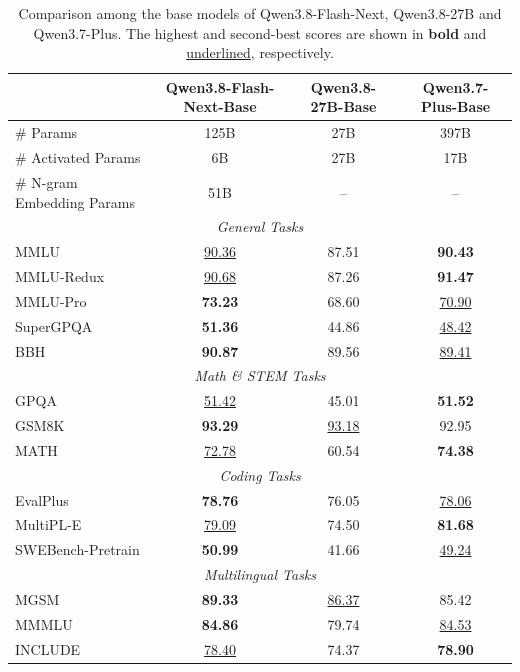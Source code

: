 \begin{table}[h]
\centering
\caption{Comparison among the base models of Qwen3.8-Flash-Next, Qwen3.8-27B and Qwen3.7-Plus. The highest and second-best scores are shown in \textbf{bold} and \underline{underlined}, respectively.}
\label{tab:qwen37-comparison}
\small
\begin{tabular}{@{}lccc@{}}
\toprule
 & \textbf{Qwen3.8-Flash-Next-Base} & \textbf{Qwen3.8-27B-Base} & \textbf{Qwen3.7-Plus-Base} \\
\midrule
\# Params & 125B & 27B & 397B \\
\# Activated Params & 6B & 27B & 17B \\
\# N-gram Embedding Params & 51B & -- & -- \\
\midrule
\multicolumn{4}{c}{\textit{General Tasks}} \\
\midrule
MMLU & \underline{90.36} & 87.51 & \textbf{90.43} \\
MMLU-Redux & \underline{90.68} & 87.26 & \textbf{91.47} \\
MMLU-Pro & \textbf{73.23} & 68.60 & \underline{70.90} \\
SuperGPQA & \textbf{51.36} & 44.86 & \underline{48.42} \\
BBH & \textbf{90.87} & 89.56 & \underline{89.41} \\
\midrule
\multicolumn{4}{c}{\textit{Math \& STEM Tasks}} \\
\midrule
GPQA & \underline{51.42} & 45.01 & \textbf{51.52} \\
GSM8K & \textbf{93.29} & \underline{93.18} & 92.95 \\
MATH & \underline{72.78} & 60.54 & \textbf{74.38} \\
\midrule
\multicolumn{4}{c}{\textit{Coding Tasks}} \\
\midrule
EvalPlus & \textbf{78.76} & 76.05 & \underline{78.06} \\
MultiPL-E & \underline{79.09} & 74.50 & \textbf{81.68} \\
SWEBench-Pretrain & \textbf{50.99} & 41.66 & \underline{49.24} \\
\midrule
\multicolumn{4}{c}{\textit{Multilingual Tasks}} \\
\midrule
MGSM & \textbf{89.33} & \underline{86.37} & 85.42 \\
MMMLU & \textbf{84.86} & 79.74 & \underline{84.53} \\
INCLUDE & \underline{78.40} & 74.37 & \textbf{78.90} \\
\bottomrule
\end{tabular}
\end{table}

